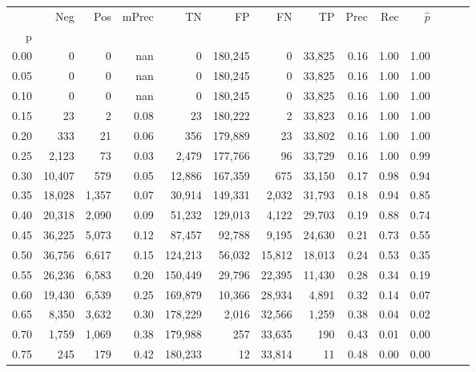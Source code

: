 \begin{tabular}{rrrrrrrrrrrrrr}
\toprule
{} &     Neg &    Pos & mPrec &       TN &       FP &      FN &      TP &  Prec &   Rec & $\hat{p}$ \\
p    &         &        &       &          &          &         &         &       &       &           \\
\midrule
0.00 &       0 &      0 &   nan &        0 &  180,245 &       0 &  33,825 &  0.16 &  1.00 &      1.00 \\
0.05 &       0 &      0 &   nan &        0 &  180,245 &       0 &  33,825 &  0.16 &  1.00 &      1.00 \\
0.10 &       0 &      0 &   nan &        0 &  180,245 &       0 &  33,825 &  0.16 &  1.00 &      1.00 \\
0.15 &      23 &      2 &  0.08 &       23 &  180,222 &       2 &  33,823 &  0.16 &  1.00 &      1.00 \\
0.20 &     333 &     21 &  0.06 &      356 &  179,889 &      23 &  33,802 &  0.16 &  1.00 &      1.00 \\
0.25 &   2,123 &     73 &  0.03 &    2,479 &  177,766 &      96 &  33,729 &  0.16 &  1.00 &      0.99 \\
0.30 &  10,407 &    579 &  0.05 &   12,886 &  167,359 &     675 &  33,150 &  0.17 &  0.98 &      0.94 \\
0.35 &  18,028 &  1,357 &  0.07 &   30,914 &  149,331 &   2,032 &  31,793 &  0.18 &  0.94 &      0.85 \\
0.40 &  20,318 &  2,090 &  0.09 &   51,232 &  129,013 &   4,122 &  29,703 &  0.19 &  0.88 &      0.74 \\
0.45 &  36,225 &  5,073 &  0.12 &   87,457 &   92,788 &   9,195 &  24,630 &  0.21 &  0.73 &      0.55 \\
0.50 &  36,756 &  6,617 &  0.15 &  124,213 &   56,032 &  15,812 &  18,013 &  0.24 &  0.53 &      0.35 \\
0.55 &  26,236 &  6,583 &  0.20 &  150,449 &   29,796 &  22,395 &  11,430 &  0.28 &  0.34 &      0.19 \\
0.60 &  19,430 &  6,539 &  0.25 &  169,879 &   10,366 &  28,934 &   4,891 &  0.32 &  0.14 &      0.07 \\
0.65 &   8,350 &  3,632 &  0.30 &  178,229 &    2,016 &  32,566 &   1,259 &  0.38 &  0.04 &      0.02 \\
0.70 &   1,759 &  1,069 &  0.38 &  179,988 &      257 &  33,635 &     190 &  0.43 &  0.01 &      0.00 \\
0.75 &     245 &    179 &  0.42 &  180,233 &       12 &  33,814 &      11 &  0.48 &  0.00 &      0.00 \\

\end{tabular}
